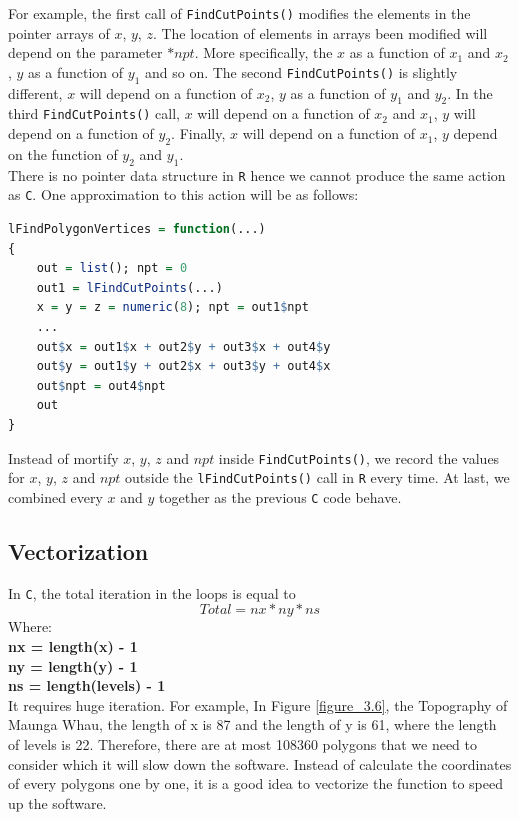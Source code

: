 \documentclass[11pt,twoside]{report}
\begin{document}
For example, the first call of \texttt{FindCutPoints()} modifies the elements in the pointer arrays of $x$, $y$, $z$. The location of elements in arrays been modified will depend on the parameter $*npt$. More specifically, the $x$ as a function of $x_1$ and $x_2$, $y$ as a function of $y_1$ and so on. The second \texttt{FindCutPoints()} is slightly different, $x$ will depend on a function of $x_2$, $y$ as a function of $y_1$ and $y_2$. In the third \texttt{FindCutPoints()} call, $x$ will depend on a function of $x_2$ and $x_1$, $y$ will depend on a function of $y_2$. Finally, $x$ will depend on a function of $x_1$, $y$ depend on the function of $y_2$ and $y_1$. \\

There is no pointer data structure in \texttt{R} hence we cannot produce the same action as \texttt{C}. One approximation to this action will be as follows:
\begin{lstlisting}[language = R]
lFindPolygonVertices = function(...)
{
    out = list(); npt = 0
    out1 = lFindCutPoints(...)
    x = y = z = numeric(8); npt = out1$npt
    ...
    out$x = out1$x + out2$y + out3$x + out4$y
    out$y = out1$y + out2$x + out3$y + out4$x
    out$npt = out4$npt
    out
}
\end{lstlisting}
Instead of mortify $x$, $y$, $z$ and $npt$ inside \texttt{FindCutPoints()}, we record the values for $x$, $y$, $z$ and $npt$ outside the \texttt{lFindCutPoints()} call in \texttt{R} every time. At last, we combined every $x$ and $y$ together as the previous \texttt{C} code behave. 


\subsection{Vectorization}
In \texttt{C}, the total iteration in the loops is equal to
\begin{equation}
Total = nx * ny * ns
\end{equation}
Where:\\
\textbf{nx = length(x) - 1}\\
\textbf{ny = length(y) - 1}\\
\textbf{ns = length(levels) - 1}\\

It requires huge iteration. For example, In Figure \ref{figure_3.6}, the Topography of Maunga Whau, the length of x is 87 and the length of y is 61, where the length of levels is 22. Therefore, there are at most 108360 polygons that we need to consider which it will slow down the software. Instead of calculate the coordinates of every polygons one by one, it is a good idea to vectorize the function to speed up the software.
\end{document}
